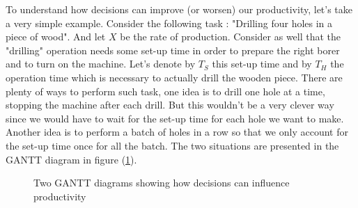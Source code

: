 To understand how decisions can improve (or worsen) our productivity, let's take a very simple example. Consider the following task : "Drilling four holes in a piece of wood". And let $X$ be the rate of production. Consider as well that the "drilling" operation needs some set-up time in order to prepare the right borer and to turn on the machine. Let's denote by $T_S$ this set-up time and by $T_H$ the operation time which is necessary to actually drill the wooden piece. There are plenty of ways to perform such task, one idea is to drill one hole at a time, stopping the machine after each drill. But this wouldn't be a very clever way since we would have to wait for the set-up time for each hole we want to make. Another idea is to perform a batch of holes in a row so that we only account for the set-up time once for all the batch. The two situations are presented in the GANTT diagram in figure (\ref{intro:gantt}).

\begin{figure}[h!]
    \centering
    \caption{\label{intro:gantt}Two GANTT diagrams showing how decisions can influence productivity}
\end{figure}

